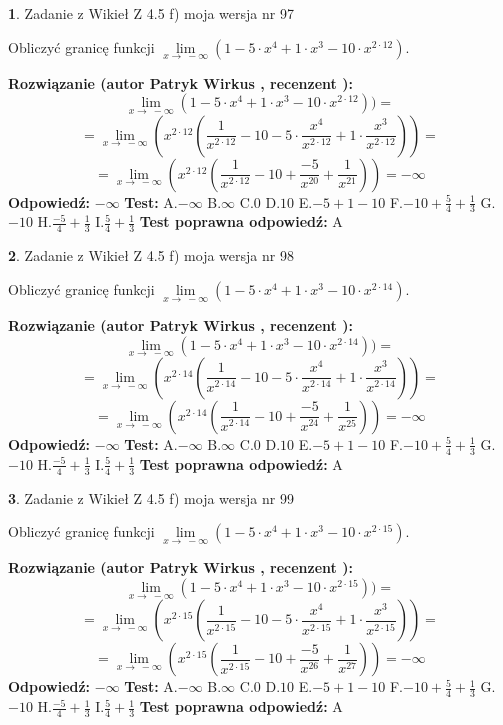 \documentclass[12pt, a4paper]{article}
\theoremstyle{definition} %
\newtheorem{zad}{}
\newcommand{\zadStart}[1]{\begin{zad}#1\newline}
\newcommand{\zadStop}{\end{zad}}
\newcommand{\rozwStart}[2]{\noindent \textbf{Rozwiązanie (autor #1 , recenzent #2): }\newline}
\newcommand{\rozwStop}{\newline}
\newcommand{\odpStart}{\noindent \textbf{Odpowiedź:}\newline}
\newcommand{\odpStop}{\newline}
\newcommand{\testStart}{\noindent \textbf{Test:}\newline}
\newcommand{\testStop}{\newline}
\newcommand{\kluczStart}{\noindent \textbf{Test poprawna odpowiedź:}\newline}
\newcommand{\kluczStop}{\newline}
\begin{document}
\zadStart{Zadanie z Wikieł Z 4.5 f) moja wersja nr 97}



Obliczyć granicę funkcji  $\lim\limits_{x\to\ -\infty}(1 - 5 \cdot x^{4}+1 \cdot x^{3}- 10 \cdot x^{2\cdot12})$.
\zadStop
\rozwStart{Patryk Wirkus}{}
$$\lim\limits_{x\to\ -\infty}(1 - 5 \cdot x^{4}+1 \cdot x^{3}- 10 \cdot x^{2\cdot12}))=$$
$$=\lim\limits_{x\to\ -\infty}(x^{2\cdot12}(\frac{1}{x^{2\cdot12}}-10 -5 \cdot \frac{x^{4}}{x^{2\cdot12}}+1 \cdot \frac{x^{3}}{x^{2\cdot12}}))=$$
$$=\lim\limits_{x\to\ -\infty}(x^{2\cdot12}(\frac{1}{x^{2\cdot12}}-10 + \frac{-5}{x^{20}}+ \frac{1}{x^{21}}))=-\infty$$
\rozwStop
\odpStart
$-\infty$
\odpStop
\testStart
A.$-\infty$ B.$\infty$ C.$0$ D.$10$ E.$-5 + 1 - 10$
F.$-10+\frac{5}{4}+\frac{1}{3}$ G.$-10$
H.$\frac{-5}{4}+\frac{1}{3}$
I.$\frac{5}{4}+\frac{1}{3}$
\testStop
\kluczStart
A
\kluczStop



\zadStart{Zadanie z Wikieł Z 4.5 f) moja wersja nr 98}



Obliczyć granicę funkcji  $\lim\limits_{x\to\ -\infty}(1 - 5 \cdot x^{4}+1 \cdot x^{3}- 10 \cdot x^{2\cdot14})$.
\zadStop
\rozwStart{Patryk Wirkus}{}
$$\lim\limits_{x\to\ -\infty}(1 - 5 \cdot x^{4}+1 \cdot x^{3}- 10 \cdot x^{2\cdot14}))=$$
$$=\lim\limits_{x\to\ -\infty}(x^{2\cdot14}(\frac{1}{x^{2\cdot14}}-10 -5 \cdot \frac{x^{4}}{x^{2\cdot14}}+1 \cdot \frac{x^{3}}{x^{2\cdot14}}))=$$
$$=\lim\limits_{x\to\ -\infty}(x^{2\cdot14}(\frac{1}{x^{2\cdot14}}-10 + \frac{-5}{x^{24}}+ \frac{1}{x^{25}}))=-\infty$$
\rozwStop
\odpStart
$-\infty$
\odpStop
\testStart
A.$-\infty$ B.$\infty$ C.$0$ D.$10$ E.$-5 + 1 - 10$
F.$-10+\frac{5}{4}+\frac{1}{3}$ G.$-10$
H.$\frac{-5}{4}+\frac{1}{3}$
I.$\frac{5}{4}+\frac{1}{3}$
\testStop
\kluczStart
A
\kluczStop



\zadStart{Zadanie z Wikieł Z 4.5 f) moja wersja nr 99}



Obliczyć granicę funkcji  $\lim\limits_{x\to\ -\infty}(1 - 5 \cdot x^{4}+1 \cdot x^{3}- 10 \cdot x^{2\cdot15})$.
\zadStop
\rozwStart{Patryk Wirkus}{}
$$\lim\limits_{x\to\ -\infty}(1 - 5 \cdot x^{4}+1 \cdot x^{3}- 10 \cdot x^{2\cdot15}))=$$
$$=\lim\limits_{x\to\ -\infty}(x^{2\cdot15}(\frac{1}{x^{2\cdot15}}-10 -5 \cdot \frac{x^{4}}{x^{2\cdot15}}+1 \cdot \frac{x^{3}}{x^{2\cdot15}}))=$$
$$=\lim\limits_{x\to\ -\infty}(x^{2\cdot15}(\frac{1}{x^{2\cdot15}}-10 + \frac{-5}{x^{26}}+ \frac{1}{x^{27}}))=-\infty$$
\rozwStop
\odpStart
$-\infty$
\odpStop
\testStart
A.$-\infty$ B.$\infty$ C.$0$ D.$10$ E.$-5 + 1 - 10$
F.$-10+\frac{5}{4}+\frac{1}{3}$ G.$-10$
H.$\frac{-5}{4}+\frac{1}{3}$
I.$\frac{5}{4}+\frac{1}{3}$
\testStop
\kluczStart
A
\kluczStop
\end{document}
